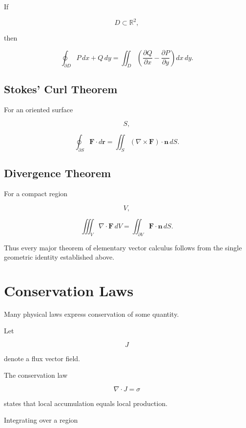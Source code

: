 \documentclass[11pt,fleqn]{book}
\numberwithin{equation}{chapter}
\theoremstyle{plain}
\theoremstyle{definition}
\theoremstyle{remark}
\begin{document}
If

\[
D\subset\mathbb R^2,
\]

then

\[
\boxed{
\oint_{\partial D}
P\,dx+Q\,dy
=
\iint_D
\left(
\frac{\partial Q}{\partial x}
-
\frac{\partial P}{\partial y}
\right)
dx\,dy.
}
\]


\subsection{Stokes' Curl Theorem}

For an oriented surface

\[
S,
\]

\[
\boxed{
\oint_{\partial S}
\mathbf F\cdot d\mathbf r
=
\iint_S
(\nabla\times\mathbf F)\cdot\mathbf n\,dS.
}
\]


\subsection{Divergence Theorem}

For a compact region

\[
V,
\]

\[
\boxed{
\iiint_V
\nabla\cdot\mathbf F\,dV
=
\iint_{\partial V}
\mathbf F\cdot\mathbf n\,dS.
}
\]

Thus every major theorem of elementary vector calculus follows from the
single geometric identity established above.


\section{Conservation Laws}

Many physical laws express conservation of some quantity.

Let

\[
J
\]

denote a flux vector field.

The conservation law

\[
\boxed{
\nabla\cdot J
=
\sigma
}
\]

states that local accumulation equals local production.

Integrating over a region
\end{document}
